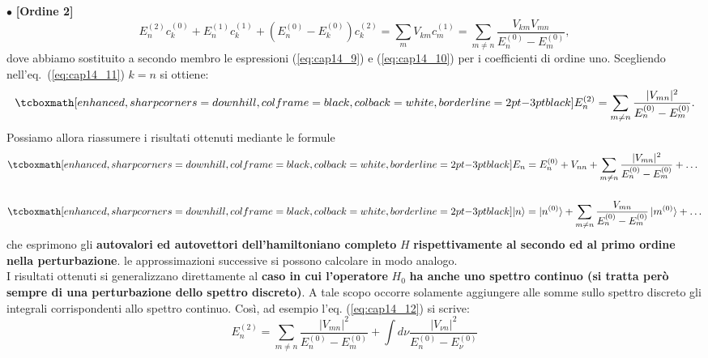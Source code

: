 \documentclass[a4paper,12pt,oneside]{book}
\begin{document}
$\bullet$ \textbf{[Ordine 2]}\\
	\begin{equation}
			E_n^{(2)}c_k^{(0)}+E_n^{(1)}c_k^{(1)}+ \left( E_n^{(0)}-E_k ^{(0)}\right) c_k^{(2)}  = \sum _m V_{km} c_m ^{(1)} = \sum _{m\neq n} \frac{V_{km} V_{mn}}{E_n^{(0)}-E_m ^{(0)}},
	\label{eq:cap14_11}
	\end{equation}
dove abbiamo sostituito a secondo membro le espressioni (\ref{eq:cap14_9}) e (\ref{eq:cap14_10}) per i coefficienti di ordine uno. Scegliendo nell'eq.~(\ref{eq:cap14_11}) $k=n$ si ottiene:
	\begin{equation}
		\tcboxmath[enhanced, sharp corners=downhill, colframe=black, colback=white, borderline={2pt}{-3pt}{black}]{
			E_n ^{(2)} = \sum _{m \neq n } \frac{\vert V_{mn} \vert ^2}{E_n ^{(0)}-E_m ^{(0)}}.
			}
	\label{eq:cap14_12}
	\end{equation}
Possiamo allora riassumere i risultati ottenuti mediante le formule
	\begin{align}
		& \tcboxmath[enhanced, sharp corners=downhill, colframe=black, colback=white, borderline={2pt}{-3pt}{black}]{
			E_n = E_n ^{(0)}+ V_{nn} +\sum _{m \neq n } \frac{\vert V_{mn} \vert ^2}{E_n ^{(0)}-E_m ^{(0)}}+ \dots
			} \\[0.5cm]
		& \tcboxmath[enhanced, sharp corners=downhill, colframe=black, colback=white, borderline={2pt}{-3pt}{black}]{
 			\vert n \rangle = \vert n^{(0)} \rangle +\sum _{m \neq n } \frac{V_{mn} }{E_n ^{(0)}-E_m ^{(0)}}\, \vert m^{(0)}\rangle+ \dots 
			 }
	\end{align}
che esprimono gli \textbf{autovalori ed autovettori dell'hamiltoniano completo} $H$ \textbf{rispettivamente al secondo ed al primo ordine nella perturbazione}. le approssimazioni successive si possono calcolare in modo analogo.\\

I risultati ottenuti si generalizzano direttamente al \textbf{caso in cui l'operatore} $H_0$ \textbf{ha anche uno spettro continuo (si tratta però sempre di una perturbazione dello spettro discreto)}. A tale scopo occorre solamente aggiungere alle somme sullo spettro discreto gli integrali corrispondenti allo spettro continuo. Così, ad esempio l'eq. (\ref{eq:cap14_12}) si scrive:
	\begin{equation}
		E_n ^{(2)} = \sum _{m \neq n} \frac{\vert V_{mn} \vert ^2}{E_n ^{(0)}-E_m ^{(0)}}+ \int d\nu \frac{\vert V_{\nu n} \vert ^2}{E_n ^{(0)}-E_{\nu} ^{(0)}} 
	\end{equation}
\end{document}
